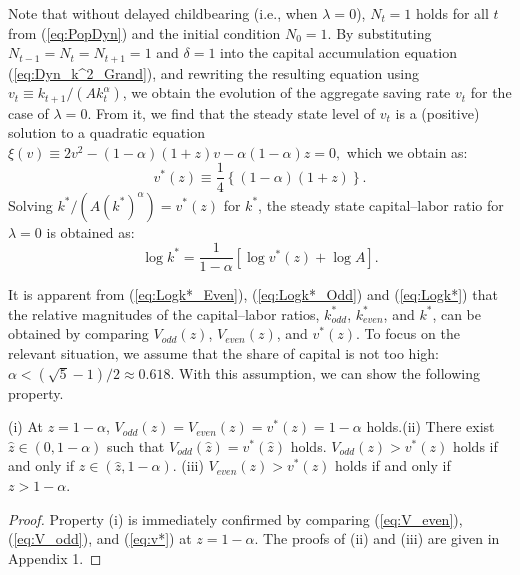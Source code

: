 \documentclass[nogrid]{MBE}%
\begin{document}
{Note that without delayed childbearing (i.e., when $\lambda=0$), $N_{t}=1$
holds for all $t$ from (\ref{eq:PopDyn}) and the initial condition $N_{0}=1$.
By substituting $N_{t-1}=N_{t}=N_{t+1}=1$ and $\delta=1$ into the capital
accumulation equation (\ref{eq:Dyn_k^2_Grand}), and rewriting the resulting
equation using $v_{t}\equiv k_{t+1}/(Ak_{t}^{\alpha})$, we obtain the
evolution of the aggregate saving rate $v_{t}$ for the case of $\lambda=0$.
From it, we find that the steady state level of $v_{t}$ is a (positive)
solution to a quadratic equation $\xi\left(  v\right)  \equiv2v^{2}-\left(
1-\alpha\right)  \left(  1+z\right)  v-\alpha\left(  1-\alpha\right)  z=0,$
which we obtain as:
\begin{equation}
v^{\ast}(z)\equiv\frac{1}{4}\left\{  \left(  1-\alpha\right)  \left(
1+z\right)\right\}  .\label{eq:v*}%
\end{equation}
Solving  $k^{\ast}/(A\left(  k^{\ast}\right)  ^{\alpha})=v^{\ast}(z)$ for
$k^{\ast}$, the steady state capital--labor ratio for $\lambda=0$ is obtained
as:
\begin{equation}
\log k^{\ast}=\frac{1}{1-\alpha}\left[  \log v^{\ast}(z)+\log A\right]
.\label{eq:Logk*}%
\end{equation}


It is apparent from (\ref{eq:Logk*_Even}), (\ref{eq:Logk*_Odd}) and
(\ref{eq:Logk*}) that the relative magnitudes of the capital--labor ratios,
$k_{odd}^{\ast}$, $k_{even}^{\ast}$, and \noindent$k^{\ast}$, can be obtained
by comparing $V_{odd}(z)$, $V_{even}(z)$, and $v^{\ast}(z)$. To focus on the
relevant situation, we assume that the share of capital is not too high:
$\alpha<\left(  \sqrt{5}-1\right)  /2 \approx0.618$. With this assumption, we
can show the following property.

\begin{flLem}
\label{lm:Comparison}\textrm{(i)} At $z=1-\alpha$, $V_{odd}(z)=V_{even}(z)=v^{\ast}(z)=1-\alpha$
holds.\newline\textrm{(ii)} There exist $\widehat{z}\in\left(  0,1-\alpha\right)  $ such that
$V_{odd}(\widehat z)=v^{\ast}(\widehat z)$ holds. $V_{odd}(z)>v^{\ast}(z)$ holds if and only if $z
\in(\widehat{z}, 1-\alpha)$.
\newline\textrm{(iii)} $V_{even}(z)>v^{\ast}(z)$ holds if and only if $z>1-\alpha$.
\end{flLem}

\begin{proof}
Property (i) is immediately confirmed by comparing (\ref{eq:V_even}),
(\ref{eq:V_odd}), and (\ref{eq:v*}) at $z=1-\alpha$. The proofs of (ii) and
(iii) are given in Appendix 1.
\end{proof}

}
\end{document}

